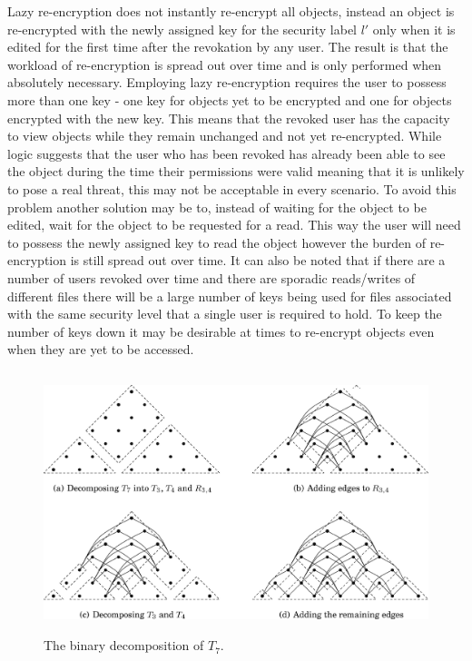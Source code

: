 \documentclass[10pt, titlepage]{article}
\begin{document}
\newline \indent Lazy re-encryption does not instantly re-encrypt all objects, instead an object is re-encrypted with the newly assigned key for the security label $l'$ only when it is edited for the first time after the revokation by any user. The result is that the workload of re-encryption is spread out over time and is only performed when absolutely necessary. Employing lazy re-encryption requires the user to possess more than one key - one key for objects yet to be encrypted and one for objects encrypted with the new key.\cite{lazyEncryption} This means that the revoked user has the capacity to view objects while they remain unchanged and not yet re-encrypted. While logic suggests that the user who has been revoked has already been able to see the object during the time their permissions were valid meaning that it is unlikely to pose a real threat, this may not be acceptable in every scenario. To avoid this problem another solution may be to, instead of waiting for the object to be edited, wait for the object to be requested for a read. This way the user will need to possess the newly assigned key to read the object however the burden of re-encryption is still spread out over time. It can also be noted that if there are a number of users revoked over time and there are sporadic reads/writes of different files there will be a large number of keys being used for files associated with the same security level that a single user is required to hold. To keep the number of keys down it may be desirable at times to re-encrypt objects even when they are yet to be accessed.

\begin{figure}
\centerline{\includegraphics[height=3.0in,width=6in,angle=0]{binarydecompo.pdf}}
\caption{The binary decomposition of $T_{7}$.\cite{mainPaper}}
\label{fig:binarydecomp}
\end{figure}
\end{document}
